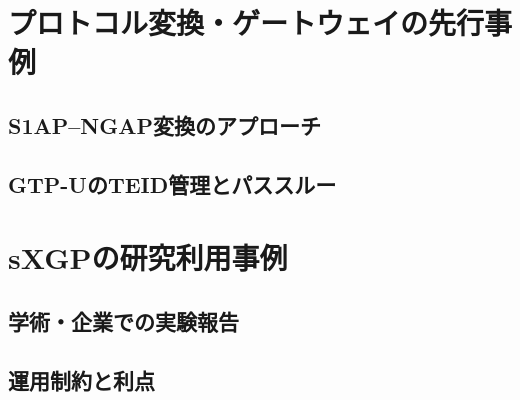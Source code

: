 \section{プロトコル変換・ゲートウェイの先行事例}
\subsection{S1AP–NGAP変換のアプローチ}
\subsection{GTP-UのTEID管理とパススルー}

\section{sXGPの研究利用事例}
\subsection{学術・企業での実験報告}
\subsection{運用制約と利点}
